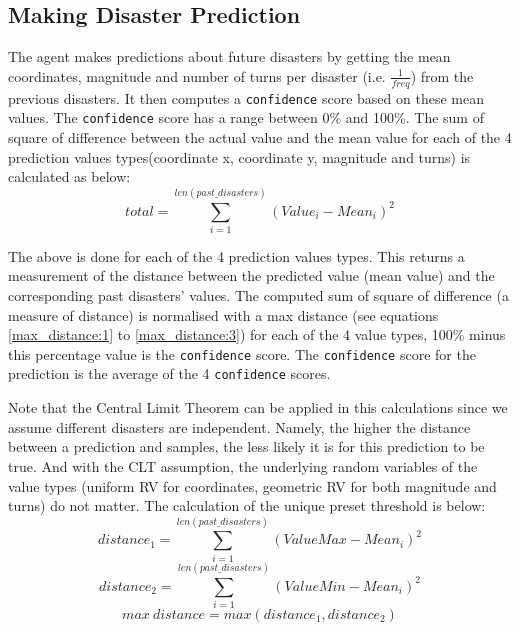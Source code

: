 \subsection{Making Disaster Prediction}
The agent makes predictions about future disasters by getting the mean coordinates, magnitude and number of turns per disaster (i.e. $\frac{1}{freq}$) from the previous disasters. It then computes a \texttt{confidence} score based on these mean values. The \texttt{confidence} score has a range between 0\% and 100\%. The sum of square of difference between the actual value and the mean value for each of the 4 prediction values types(coordinate x, coordinate y, magnitude and turns) is calculated as below:
\begin{equation}
    total = \sum_{i=1}^{len(past\_disasters)}(Value_i - Mean_i)^2
\end{equation}

The above is done for each of the 4 prediction values types. This returns a measurement of the distance between the predicted value (mean value) and the corresponding past disasters' values. The computed sum of square of difference (a measure of distance) is normalised with a max distance (see equations \ref{max_distance:1} to \ref{max_distance:3}) for each of the 4 value types, 100\% minus this percentage value is the \texttt{confidence} score. The \texttt{confidence} score for the prediction is the average of the 4 \texttt{confidence} scores.

Note that the Central Limit Theorem can be applied in this calculations since we assume different disasters are independent. Namely, the higher the distance between a prediction and samples, the less likely it is for this prediction to be true. And with the CLT assumption, the underlying random variables of the value types (uniform RV for coordinates, geometric RV for both magnitude and turns) do not matter. The calculation of the unique preset threshold is below:
\begin{equation}\label{max_distance:1}
    distance_1 = \sum_{i=1}^{len(past\_disasters)}(ValueMax - Mean_i)^2
\end{equation}
\begin{equation}\label{max_distance:2}
    distance_2 = \sum_{i=1}^{len(past\_disasters)}(ValueMin - Mean_i)^2
\end{equation}
\begin{equation}\label{max_distance:3}
    max\: distance = max (distance_1, distance_2)
\end{equation}

